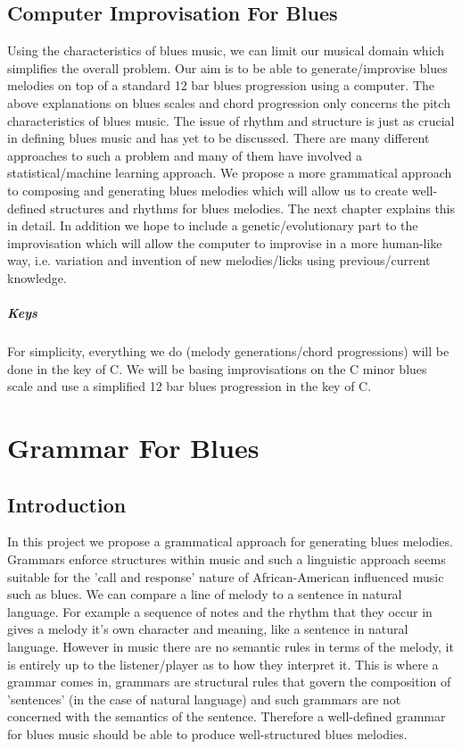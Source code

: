 \documentclass[pdftex,12pt,a4paper]{report}
\begin{document}
\section{Computer Improvisation For Blues}
Using the characteristics of blues music, we can limit our musical domain which simplifies the overall problem. Our aim is to be able to generate/improvise blues melodies on top of a standard 12 bar blues progression using a computer. The above explanations on blues scales and chord progression only concerns the pitch characteristics of blues music. The issue of rhythm and structure is just as crucial in defining blues music and has yet to be discussed. There are many different approaches to such a problem and many of them have involved a statistical/machine learning approach. We propose a more grammatical approach to composing and generating blues melodies which will allow us to create well-defined structures and rhythms for blues melodies. The next chapter explains this in detail. In addition we hope to include a genetic/evolutionary part to the improvisation which will allow the computer to improvise in a more human-like way, i.e. variation and invention of new melodies/licks using previous/current knowledge.

\paragraph{Keys}
For simplicity, everything we do (melody generations/chord progressions) will be done in the key of C. We will be basing improvisations on the C minor blues scale and use a simplified 12 bar blues progression in the key of C.

\pagebreak

\chapter{Grammar For Blues}

\section{Introduction}
In this project we propose a grammatical approach for generating blues melodies.  Grammars enforce structures within music and such a linguistic approach seems suitable for the 'call and response' nature of African-American influenced music such as blues. We can compare a line of melody to a sentence in natural language. For example a sequence of notes and the rhythm that they occur in gives a melody it's own character and meaning, like a sentence in natural language. However in music there are no semantic rules in terms of the melody, it is entirely up to the listener/player as to how they interpret it. This is where a grammar comes in, grammars are structural rules that govern the composition of 'sentences' (in the case of natural language) and such grammars are not concerned with the semantics of the sentence. Therefore a well-defined grammar for blues music should be able to produce well-structured blues melodies.
\end{document}
